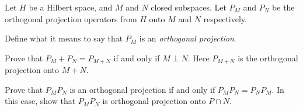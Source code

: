Let $H$ be a Hilbert space, and $M$ and $N$ closed subspaces. Let
$P_M$ and $P_N$ be the orthogonal projection operators from $H$ onto
$M$ and $N$ respectively.
\begin{alist}
\item Define what it means to say that $P_M$ is an \emph{orthogonal
projection}.
\item Prove that $P_M+P_N=P_{M+N}$ if and only if $M\perp N$. Here
$P_{M+N}$ is the orthogonal projection onto $M+N$.
\item Prove that $P_MP_N$ is an orthogonal projection if and only if
$P_MP_N=P_NP_M$. In this case, show that $P_MP_N$ is orthogonal
projection onto $P\cap N$.
\end{alist}
